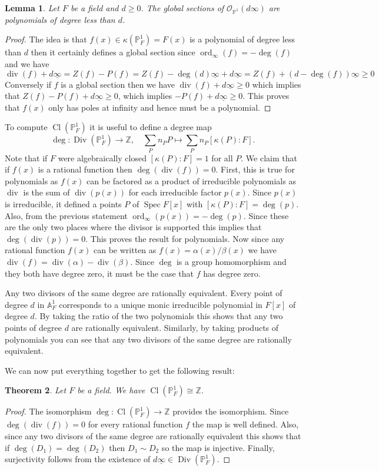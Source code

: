 \documentclass[12pt]{article}
\numberwithin{equation}{section}
\newtheorem{theorem}{Theorem}[subsection]
\newtheorem{lemma}[theorem]{Lemma}
\theoremstyle{definition}
\theoremstyle{remark}
\newcommand{\ZZ}{\mathbb{Z}}
\newcommand{\Ocal}{\mathcal{O}}
\newcommand{\PP}{\mathbb{P}}
\renewcommand{\AA}{\mathbb{A}}
\newcommand{\Spec}{\operatorname{Spec}}
\newcommand{\ord}{\operatorname{ord}}
\newcommand{\Div}{\operatorname{Div}}
\renewcommand{\div}{\operatorname{div}}
\newcommand{\Cl}{\operatorname{Cl}}
\begin{document}
\begin{lemma}
	Let $F$ be a field and $d\geq 0$. The global sections of $\Ocal_{\PP^1}(d\infty)$ are polynomials of degree less than $d$.
\end{lemma}
\begin{proof}
	The idea is that $f(x) \in \kappa(\PP^1_F) = F(x)$ is a polynomial of degree less than $d$ then it certainly defines a global section since $\ord_{\infty}(f) = -\deg(f)$ and we have 
	 $$ \div(f) + d\underline{\infty}= Z(f) - P(f) = Z(f) - \deg(d) \underline{\infty} + d \underline{\infty} = Z(f) + (d-\deg(f))\underline{\infty} \geq 0$$
	Conversely if $f$ is a global section then we have $\div(f) + d\underline{\infty} \geq 0$ which implies that $Z(f) - P(f) + d \underline{\infty}\geq 0$, which implies $-P(f)+d \underline{\infty}\geq 0$.
	This proves that $f(x)$ only has poles at infinity and hence must be a polynomial.  
\end{proof}

To compute $\Cl(\PP^1_F)$ it is useful to define a degree map 
 $$ \deg: \Div(\PP^1_F) \to \ZZ, \quad \sum_P n_P P \mapsto \sum_P n_P[\kappa(P):F]. $$
Note that if $F$ were algebraically closed $[\kappa(P):F]=1$ for all $P$.
We claim that if $f(x)$ is a rational function then $\deg(\div(f))=0$.
First, this is true for polynomials as $f(x)$ can be factored as a product of irreducible polynomials as $\div$ is the sum of $\div(p(x))$ for each irreducible factor $p(x)$. 
Since $p(x)$ is irreducible, it defined a points $P$ of $\Spec F[x]$ with $[\kappa(P):F]=\deg(p)$. 
Also, from the previous statement $\ord_{\infty}(p(x)) = -\deg(p)$. 
Since these are the only two places where the divisor is supported this implies that $\deg(\div(p))=0$. 
This proves the result for polynomials. 
Now since any rational function $f(x)$ can be written as $f(x) = \alpha(x)/\beta(x)$ we have $\div(f) = \div(\alpha)-\div(\beta)$. 
Since $\deg$ is a group homomorphism and they both have degree zero, it must be the case that $f$ has degree zero.

Any two divisors of the same degree are rationally equivalent. 
Every point of degree $d$ in $\AA^1_F$ corresponds to a unique monic irreducible polynomial in $F[x]$ of degree $d$. 
By taking the ratio of the two polynomials this shows that any two points of degree $d$ are rationally equivalent. 
Similarly, by taking products of polynomials you can see that any two divisors of the same degree are rationally equivalent.
 
We can now put everything together to get the following result:
\begin{theorem}
	Let $F$ be a field. We have $\Cl(\PP^1_F)\cong \ZZ$.
\end{theorem}
\begin{proof}
	The isomorphism $\deg: \Cl(\PP^1_F) \to \ZZ$ provides the isomorphism. 
	Since $\deg(\div(f))=0$ for every rational function $f$ the map is well defined. 
	Also, since any two divisors of the same degree are rationally equivalent this shows that if $\deg(D_1)=\deg(D_2)$ then $D_1\sim D_2$ so the map is injective. 
	Finally, surjectivity follows from the existence of $d \underline{\infty} \in \Div(\PP^1_F)$. 
\end{proof}
\end{document}
